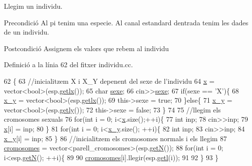 Llegim un individu. 

\begin{DoxyPrecond}{Precondició}
Al pi tenim una especie. Al canal estandard d\textquotesingle{}entrada tenim les dades de un individu. 
\end{DoxyPrecond}
\begin{DoxyPostcond}{Postcondició}
Assignem els valors que rebem al individu 
\end{DoxyPostcond}


Definició a la línia 62 del fitxer individu.\+cc.


\begin{DoxyCode}
62                                       \{
63         \textcolor{comment}{//inicialitzem X i X\_Y depenent del sexe de l'individu}
64   \hyperlink{classindividu_a3c4abda8daead156b5519f69bd224fa9}{x} = vector<bool>(esp.\hyperlink{classespecie_a884d4a0b074c42391c6e4295666047e0}{getlx}());
65   \textcolor{keywordtype}{char} \hyperlink{classindividu_ab62faa6985cc0520c33a206fc5a89e37}{sexe};
66   cin>>\hyperlink{classindividu_ab62faa6985cc0520c33a206fc5a89e37}{sexe};
67   \textcolor{keywordflow}{if}(sexe == \textcolor{charliteral}{'X'})\{
68     \hyperlink{classindividu_a51eb7827fdd5bd5302e3c962fd719fc0}{x\_y} = vector<bool>(esp.\hyperlink{classespecie_a884d4a0b074c42391c6e4295666047e0}{getlx}());
69     this->sexe = \textcolor{keyword}{true};    
70   \}\textcolor{keywordflow}{else}\{
71     \hyperlink{classindividu_a51eb7827fdd5bd5302e3c962fd719fc0}{x\_y} = vector<bool>(esp.\hyperlink{classespecie_a45ce91dbe80e60d7498e672dd487d7ed}{getly}());
72     this->sexe = \textcolor{keyword}{false};
73   \}
74         
75         \textcolor{comment}{//llegim els cromosomes sexuals}
76   \textcolor{keywordflow}{for}(\textcolor{keywordtype}{int} i = 0; i<\hyperlink{classindividu_a3c4abda8daead156b5519f69bd224fa9}{x}.size();++i)\{
77     \textcolor{keywordtype}{int} inp;
78     cin>>inp;
79     \hyperlink{classindividu_a3c4abda8daead156b5519f69bd224fa9}{x}[i] = inp;
80   \}
81   \textcolor{keywordflow}{for}(\textcolor{keywordtype}{int} i = 0; i<\hyperlink{classindividu_a51eb7827fdd5bd5302e3c962fd719fc0}{x\_y}.size(); ++i)\{
82     \textcolor{keywordtype}{int} inp;
83     cin>>inp;
84     \hyperlink{classindividu_a51eb7827fdd5bd5302e3c962fd719fc0}{x\_y}[i] = inp;
85   \}
86         \textcolor{comment}{//inicialitzem els cromosomes normals i els llegim}
87   \hyperlink{classindividu_ae5e0a83ff9e943cbcdf95b74069ad3a7}{cromosomes} = vector<parell\_cromosomes>(esp.\hyperlink{classespecie_a1af7a5322803c26b43fc5b83e089f6d1}{getN}());
88   \textcolor{keywordflow}{for}(\textcolor{keywordtype}{int} i = 0; i<esp.\hyperlink{classespecie_a1af7a5322803c26b43fc5b83e089f6d1}{getN}(); ++i)\{
89 
90     \hyperlink{classindividu_ae5e0a83ff9e943cbcdf95b74069ad3a7}{cromosomes}[i].llegir(esp.\hyperlink{classespecie_aeafc7d55dc12d3a0337740884117614c}{getl}(i));
91 
92   \}
93 \}
\end{DoxyCode}
